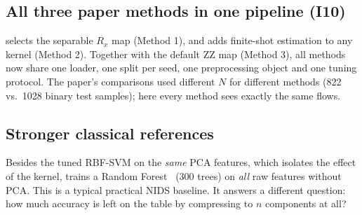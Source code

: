 \subsection{All three paper methods in one pipeline (I10)}
 selects the separable $R_x$ map (Method 1), and  adds
finite-shot estimation to any kernel (Method 2). Together with the default ZZ map (Method 3), all
methods now share one loader, one split per seed, one preprocessing object and one tuning
protocol. The paper's comparisons used different $N$ for different methods (822 vs.\ 1028 binary
test samples); here every method sees exactly the same flows.

\subsection{Stronger classical references}
Besides the tuned RBF-SVM on the \emph{same} PCA features, which isolates the effect of the kernel,
 trains a Random Forest~\cite{breiman2001} (300 trees) on \emph{all}
raw features without PCA. This is a typical practical NIDS baseline. It answers a different
question: how much accuracy is left on the table by compressing to $n$ components at all?
